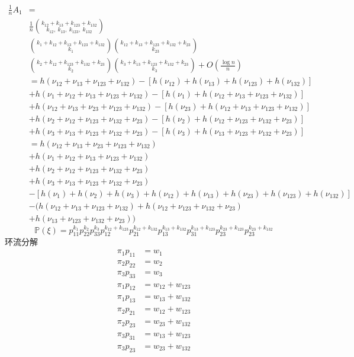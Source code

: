 \documentclass[cn,hazy,egreen,14pt,normal]{elegantnote}
\begin{document}
\begin{align*}
    \frac{1}{n} A_1 &= \\ 
    &\frac{1}{n} \binom{k_{12} + k_{13} + k_{123} +k_{132}}{k_{12}, ~k_{13}, ~k_{123}, ~k_{132}} \\
    & \binom{k_1 + k_{12} + k_{13} + k_{123} +k_{132}}{k_1}
    \binom{k_{12} +k_{13} + k_{123} +k_{132} + k_{23}}{k_{23}} \\
    &\binom{k_2 + k_{12} + k_{123} + k_{132} +k_{23}}{k_2} \binom{k_3 + k_{13} +k_{123} +k_{132} +k_{23}}{k_3} + O(\frac{\log n}{n}) \\
    &= h(\nu_{12} + \nu_{13} + \nu_{123} +\nu_{132}) - \left[h(\nu_{12}) + h(\nu_{13}) + h(\nu_{123}) + h(\nu_{132})\right] \\
    &+ h(\nu_1 + \nu_{12} + \nu_{13} + \nu_{123} +\nu_{132}) - \left[h(\nu_1) + h(\nu_{12} + \nu_{13} + \nu_{123} +\nu_{132})\right] \\
    &+ h(\nu_{12} + \nu_{13} + \nu_{23}+\nu_{123}+\nu_{132}) - \left[h(\nu_{23}) + h(\nu_{12} + \nu_{13}+\nu_{123}+\nu_{132})\right] \\
    &+ h(\nu_2 + \nu_{12} + \nu_{123} + \nu_{132} +\nu_{23}) - \left[h(\nu_2) + h(\nu_{12} + \nu_{123} + \nu_{132} +\nu_{23})\right] \\
    &+ h(\nu_3 + \nu_{13} +\nu_{123} +\nu_{132} +\nu_{23}) - \left[h(\nu_3) + h(\nu_{13} +\nu_{123} +\nu_{132} +\nu_{23})\right] \\
    &= h(\nu_{12} + \nu_{13} + \nu_{23}+\nu_{123}+\nu_{132}) \\
    &+ h(\nu_1 + \nu_{12} + \nu_{13} + \nu_{123} +\nu_{132}) \\
    &+ h(\nu_2 + \nu_{12} + \nu_{123} + \nu_{132} +\nu_{23}) \\
    &+ h(\nu_3 + \nu_{13} +\nu_{123} +\nu_{132} +\nu_{23}) \\
    &- \left[h(\nu_1) + h(\nu_2) + h(\nu_3) + h(\nu_{12}) + h(\nu_{13}) + h(\nu_{23}) + h(\nu_{123}) + h(\nu_{132})\right] \\
    &- \biggl(h(\nu_{12} + \nu_{13} + \nu_{123} +\nu_{132}) + h(\nu_{12} + \nu_{123} + \nu_{132} +\nu_{23}) \\
    & + h(\nu_{13} +\nu_{123} +\nu_{132} +\nu_{23})\biggr)
\end{align*}
$$
\mathbb{P}(\xi) = p_{11}^{k_1} p_{22}^{k_2} p_{33}^{k_3} p_{12}^{k_{12}+k_{123}} p_{21}^{k_{12}+k_{132}} p_{13}^{k_{13}+k_{132}} p_{31}^{k_{13}+k_{123}} p_{23}^{k_{23}+k_{123}} p_{23}^{k_{23}+k_{132}} 
$$
环流分解
\begin{align*}
    \pi_1 p_{11} &= w_{1} \\
    \pi_2 p_{22} &= w_{2} \\
    \pi_3 p_{33} &= w_{3} \\
    \pi_1 p_{12} &= w_{12} + w_{123}\\
    \pi_1 p_{13} &= w_{13} + w_{132}\\
    \pi_2 p_{21} &= w_{12} + w_{123}\\
    \pi_2 p_{23} &= w_{23} + w_{132}\\
    \pi_3 p_{31} &= w_{13} + w_{123}\\
    \pi_3 p_{23} &= w_{23} + w_{132}
\end{align*}
\end{document}

